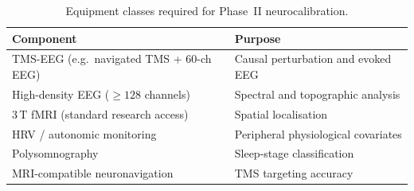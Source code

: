 \begin{table}[H]
\centering
\caption{Equipment classes required for Phase~II neurocalibration.}
\label{tab:equipment}
\begin{tabular}{@{}ll@{}}
\toprule
\textbf{Component} & \textbf{Purpose} \\
\midrule
TMS-EEG (e.g.\ navigated TMS + 60-ch EEG) & Causal perturbation and evoked EEG \\
High-density EEG ($\geq 128$ channels)    & Spectral and topographic analysis \\
3\,T fMRI (standard research access)      & Spatial localisation \\
HRV / autonomic monitoring                & Peripheral physiological covariates \\
Polysomnography                           & Sleep-stage classification \\
MRI-compatible neuronavigation            & TMS targeting accuracy \\
\bottomrule
\end{tabular}
\end{table}

